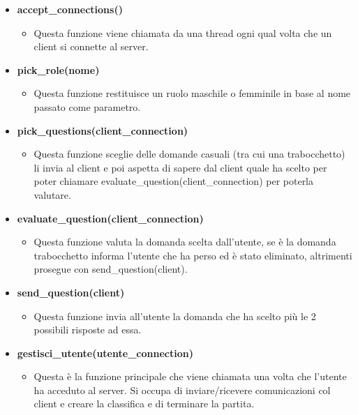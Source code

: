 \begin{itemize}
	\item \textbf{\normalsize accept\_connections()}
	\begin{itemize}
		\item \textsf{\normalsize Questa funzione viene chiamata da una thread ogni qual volta che un client si connette al server.}
	\end{itemize}
	\item \textbf{\normalsize pick\_role(nome)}
	\begin{itemize}
		\item \textsf{\normalsize Questa funzione restituisce un ruolo maschile o femminile in base al nome passato come parametro.}
	\end{itemize}
	\item \textbf{\normalsize pick\_questions(client\_connection)}
	\begin{itemize}
		\item \textsf{\normalsize Questa funzione sceglie delle domande casuali (tra cui una trabocchetto) li invia al client e poi aspetta di sapere dal client quale ha scelto per poter chiamare evaluate\_question(client\_connection) per poterla valutare.}
	\end{itemize}
	\item \textbf{\normalsize evaluate\_question(client\_connection)}
	\begin{itemize}
		\item \textsf{\normalsize Questa funzione valuta la domanda scelta dall'utente, se è la domanda trabocchetto informa l'utente che ha perso ed è stato eliminato, altrimenti prosegue con send\_question(client).}
	\end{itemize}
	\item \textbf{\normalsize send\_question(client)}
	\begin{itemize}
		\item \textsf{\normalsize Questa funzione invia all'utente la domanda che ha scelto più le 2 possibili risposte ad essa.}
	\end{itemize}
	\item \textbf{\normalsize gestisci\_utente(utente\_connection)}
	\begin{itemize}
		\item \textsf{\normalsize Questa è la funzione principale che viene chiamata una volta che l'utente ha acceduto al server. Si occupa di inviare/ricevere comunicazioni col client e creare la classifica e di terminare la partita.}
	\end{itemize}

\end{itemize}
